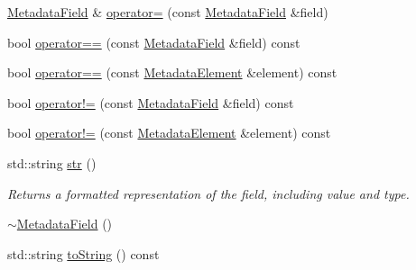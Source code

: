 \begin{DoxyCompactItemize}
\hyperlink{classBUSBOY_1_1MetadataField}{MetadataField} \& \hyperlink{classBUSBOY_1_1MetadataField_a752107a5e66986a12532ea606748d95a}{operator=} (const \hyperlink{classBUSBOY_1_1MetadataField}{MetadataField} \&field)
\item 
bool \hyperlink{classBUSBOY_1_1MetadataField_a8fc0a215619adb2f2f7eca8167211cca}{operator==} (const \hyperlink{classBUSBOY_1_1MetadataField}{MetadataField} \&field) const 
\item 
bool \hyperlink{classBUSBOY_1_1MetadataField_a0e92430d80e4ef7038f6104bd072179b}{operator==} (const \hyperlink{classBUSBOY_1_1MetadataElement}{MetadataElement} \&element) const 
\item 
bool \hyperlink{classBUSBOY_1_1MetadataField_a112861961d422cf5613e67cea2eb49e6}{operator!=} (const \hyperlink{classBUSBOY_1_1MetadataField}{MetadataField} \&field) const 
\item 
bool \hyperlink{classBUSBOY_1_1MetadataField_ac3a23c00a2964261c92da5e913bce6d1}{operator!=} (const \hyperlink{classBUSBOY_1_1MetadataElement}{MetadataElement} \&element) const 
\item 
std::string \hyperlink{classBUSBOY_1_1MetadataField_a5c6f7fb462f022c18abb53ebfecec0b6}{str} ()
\begin{DoxyCompactList}\small\item\em Returns a formatted representation of the field, including value and type. \item\end{DoxyCompactList}\item 
\hyperlink{classBUSBOY_1_1MetadataField_af83bd45ed390faa432cde8a6b2b1bc48}{$\sim$MetadataField} ()
\item 
std::string \hyperlink{classBUSBOY_1_1MetadataField_aaa19cf92f05e5cc4eb8fe2802f690b7d}{toString} () const 
\end{DoxyCompactItemize}

